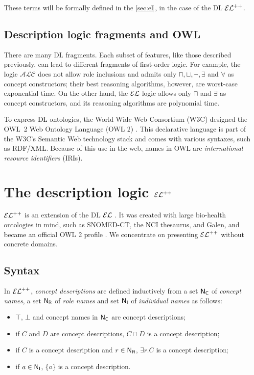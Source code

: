 These terms will be formally defined in the \autoref{sec:el}, in the case of the DL $\mathcal{EL}^{++}$.

\subsection{Description logic fragments and OWL}

There are many DL fragments. Each subset of features, like those described previously, can lead to different fragments of first-order logic. For example, the logic $\mathcal{ALC}$ does not allow role inclusions and admits only $\sqcap, \sqcup, \lnot, \exists$ and $\forall$ as concept constructors; their best reasoning algorithms, however, are worst-case exponential time. On the other hand, the $\mathcal{EL}$ logic allows only $\sqcap$ and $\exists$ as concept constructors, and its reasoning algorithms are polynomial time.

To express DL ontologies, the World Wide Web Consortium (W3C) designed the OWL~2 Web Ontology Language (OWL 2) \citep{owl2}. This declarative language is part of the W3C's Semantic Web technology stack and comes with various syntaxes, such as RDF/XML. Because of this use in the web, names in OWL are \emph{international resource identifiers} (IRIs).

\section{The description logic \texorpdfstring{$\mathcal{EL}^{++}$}{����++}}
\label{sec:el}

$\mathcal{EL}^{++}$ is an extension of the DL $\mathcal{EL}$ \citep{Baader2005a}. It was created with large bio-health ontologies in mind, such as SNOMED-CT, the NCI thesaurus, and Galen, and became an official OWL 2 profile \citep{owl2}. We concentrate on presenting $\mathcal{EL}^{++}$ without concrete domains.

\subsection{Syntax}
In $\mathcal{EL}^{++}$, \emph{concept descriptions} are defined inductively from a set $\mathsf{N_C}$ of \emph{concept names}, a set $\mathsf{N_R}$ of \emph{role names} and set $\mathsf{N_I}$ of \emph{individual names} as follows:
\begin{itemize}
	\item $\top$, $\bot$ and concept names in $\mathsf{N_C}$ are concept descriptions;
	\item if $C$ and $D$ are concept descriptions, $C \sqcap D$ is a concept description;
	\item if $C$ is a concept description and $r \in \mathsf{N_R}$, $\exists r.C$ is a concept description;
	\item if $a \in \mathsf{N_I}$, $\{a\}$ is a concept description.
\end{itemize}

